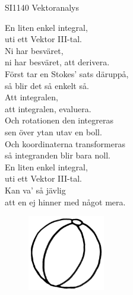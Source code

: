 \documentclass[a6paper,10pt]{article}
\begin{document}
\setlength{\oddsidemargin}{-0.47in}
\noindent
\begin{center}
\footnotesize SI1140 Vektoranalys\\
\end{center}
\begin{lyrics}
En liten enkel integral, \\
uti ett Vektor III-tal. \\
Ni har besväret, \\
ni har besväret, att derivera. 
\vspace{5pt} \\
Först tar en Stokes' sats däruppå, \\
så blir det så enkelt så. \\
Att integralen, \\
att integralen, evaluera. 
\vspace{5pt} \\
Och rotationen den integreras \\
sen över ytan utav en boll. \\
Och koordinaterna transformeras \\
så integranden blir bara noll. 
\vspace{5pt} \\
En liten enkel integral, \\
uti ett Vektor III-tal. \\
Kan va' så jävlig \\
att en ej hinner med något mera. 
\end{lyrics}
\begin{figure}[!h]
\hspace{120pt}\includegraphics[width=0.3\textwidth]{boll.jpg}
\end{figure}
\end{document}
